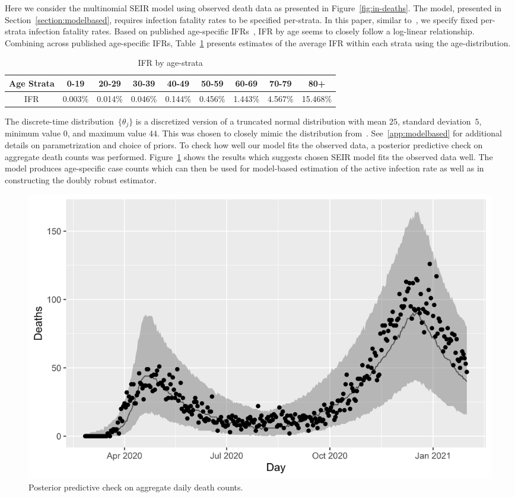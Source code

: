 \documentclass[11pt]{amsart}
\numberwithin{equation}{section}
\theoremstyle{plain}
\begin{document}
Here we consider the multinomial SEIR model using observed death data as presented in Figure~\ref{fig:in-deaths}. The model, presented in Section~\ref{section:modelbased}, requires infection fatality rates to be specified per-strata.  In this paper, similar to~\cite{Johndrow2020}, we specify fixed per-strata infection fatality rates. Based on published age-specific IFRs~\cite{Levin2020}, IFR by age seems to closely follow a log-linear relationship. Combining across published age-specific IFRs, Table~\ref{tab:ifrperage} presents estimates of the average IFR within each strata using the age-distribution.
\begin{table}[!th]
\begin{tabular}{c | c c c c c c c c}
Age Strata & 0-19 & 20-29 & 30-39 & 40-49 & 50-59 & 60-69 & 70-79 & 80+ \\ \hline
IFR & 0.003\% & 0.014\% & 0.046\% & 0.144\% & 0.456\% & 1.443\% & 4.567\% & 15.468\%
\end{tabular}
\caption{IFR by age-strata}
\label{tab:ifrperage}
\end{table}
The discrete-time distribution~$\{ \theta_{j} \}$ is a discretized version of a truncated normal distribution with mean $25$, standard deviation~$5$, minimum value $0$, and maximum value $44$.  This was chosen to closely mimic the distribution from~\cite{Johndrow2020}.  See~\ref{app:modelbased} for additional details on parametrization and choice of priors. To check how well our model fits the observed data, a posterior predictive check on aggregate death counts was performed. Figure~\ref{fig:deathsppc} shows the results which suggests chosen SEIR model fits the observed data well.  The model produces age-specific case counts which can then be used for model-based estimation of the active infection rate as well as in constructing the doubly robust estimator.

\begin{figure}[!th]
\centering
\includegraphics[width=.6\linewidth]{../figs/deaths_ppc.png}
\caption{Posterior predictive check on aggregate daily death counts.}
\label{fig:deathsppc}
\end{figure}
\end{document}
